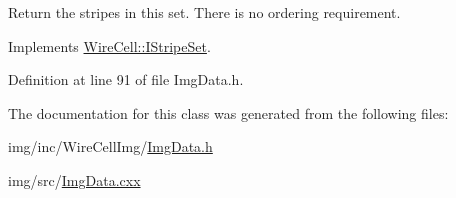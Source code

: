 Return the stripes in this set. There is no ordering requirement. 



Implements \hyperlink{class_wire_cell_1_1_i_stripe_set_a45e9d5fa6b0f66a4da105b23ecf214ca}{Wire\+Cell\+::\+I\+Stripe\+Set}.



Definition at line 91 of file Img\+Data.\+h.



The documentation for this class was generated from the following files\+:\begin{DoxyCompactItemize}
\item 
img/inc/\+Wire\+Cell\+Img/\hyperlink{_img_data_8h}{Img\+Data.\+h}\item 
img/src/\hyperlink{_img_data_8cxx}{Img\+Data.\+cxx}\end{DoxyCompactItemize}
